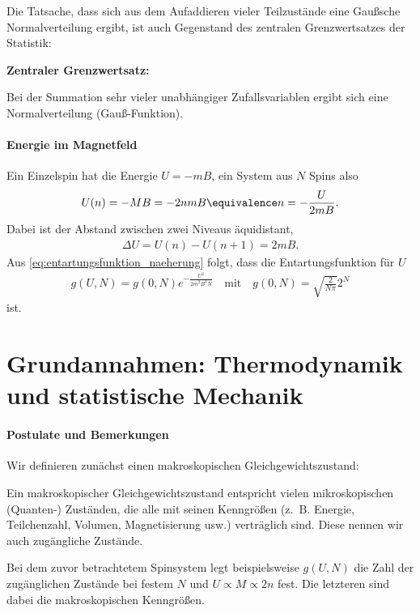 Die Tatsache, dass sich aus dem Aufaddieren vieler Teilzustände eine Gaußsche Normalverteilung ergibt, ist auch Gegenstand des zentralen Grenzwertsatzes der Statistik:
\begin{formal}
    \textbf{Zentraler Grenzwertsatz:}

    Bei der Summation sehr vieler unabhängiger Zufallsvariablen ergibt sich eine Normalverteilung (Gauß-Funktion).
\end{formal}


\paragraph*{Energie im Magnetfeld}

Ein Einzelspin hat die Energie $U=-mB$, ein System aus $N$ Spins also
\begin{align*}
    U(n)=-MB = -2nmB \equivalence n = -\frac{U}{2mB}. 
\end{align*}
Dabei ist der Abstand zwischen zwei Niveaus äquidistant,
\begin{align*}
    \Delta U = U(n) - U(n+1) = 2mB.
\end{align*}
Aus \eqref{eq:entartungsfunktion_naeherung} folgt, dass die Entartungsfunktion für $U$
\begin{align*}
    g(U,N) = g(0,N) e^{-\frac{U^2}{2m^2B^2N}} \quad \mathrm{mit}\quad g(0,N) = \sqrt{\frac{2}{N\pi }} 2^N
\end{align*}
ist.


\section{Grundannahmen: Thermodynamik und statistische Mechanik}

\paragraph*{Postulate und Bemerkungen}

Wir definieren zunächst einen makroskopischen Gleichgewichtszustand:
\begin{formal}
    Ein makroskopischer Gleichgewichtszustand entspricht vielen mikroskopischen (Quanten-) Zuständen, die alle mit seinen Kenngrößen (z.~B. Energie, Teilchenzahl, Volumen, Magnetisierung usw.) verträglich sind. Diese nennen wir auch zugängliche Zustände.
\end{formal}

Bei dem zuvor betrachtetem Spinsystem legt beispielsweise $g(U,N)$ die Zahl der zugänglichen Zustände bei festem $N$ und $U\propto M \propto 2n$ fest. Die letzteren sind dabei die makroskopischen Kenngrößen.

